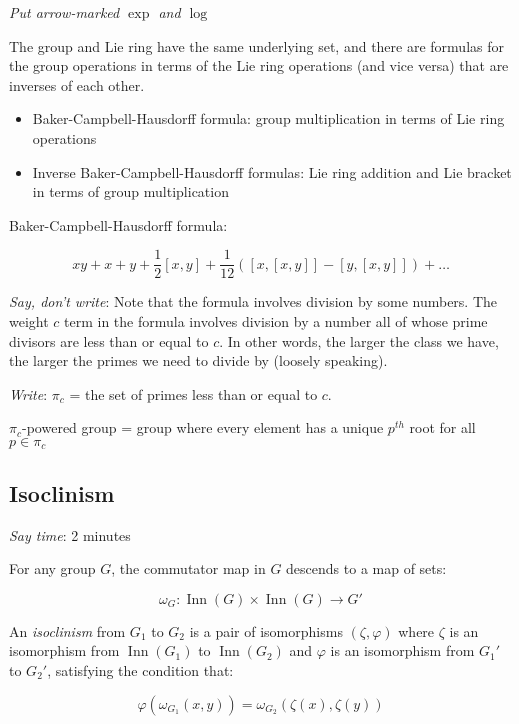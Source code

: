 \documentclass[10pt]{amsart}
\begin{document}
{\em Put arrow-marked $\exp$ and $\log$}

The group and Lie ring have the same underlying set, and there are
formulas for the group operations in terms of the Lie ring operations
(and vice versa) that are inverses of each other.

\begin{itemize}
\item Baker-Campbell-Hausdorff formula: group multiplication in terms
  of Lie ring operations
\item Inverse Baker-Campbell-Hausdorff formulas: Lie ring addition and
  Lie bracket in terms of group multiplication
\end{itemize}

Baker-Campbell-Hausdorff formula:

$$xy + x + y + \frac{1}{2}[x,y] + \frac{1}{12}([x,[x,y]] - [y,[x,y]]) + \dots$$

{\em Say, don't write}: Note that the formula involves division by
some numbers. The weight $c$ term in the formula involves division by
a number all of whose prime divisors are less than or equal to $c$. In
other words, the larger the class we have, the larger the primes we
need to divide by (loosely speaking).

{\em Write}: $\pi_c$ = the set of primes less than or equal to $c$.

$\pi_c$-powered group = group where every element has a unique
$p^{th}$ root for all $p \in \pi_c$

\subsection{Isoclinism}

{\em Say time}: 2 minutes

For any group $G$, the commutator map in $G$ descends to a map of sets:

$$\omega_G: \operatorname{Inn}(G) \times \operatorname{Inn}(G) \to G'$$

An {\em isoclinism} from $G_1$ to $G_2$ is a pair of isomorphisms
$(\zeta,\varphi)$ where $\zeta$ is an isomorphism from
$\operatorname{Inn}(G_1)$ to $\operatorname{Inn}(G_2)$ and $\varphi$ is an
isomorphism from $G_1'$ to $G_2'$, satisfying the condition that:

\begin{equation}\label{eq:homoclinism-pointed}
  \varphi(\omega_{G_1}(x,y)) = \omega_{G_2}(\zeta(x),\zeta(y))
\end{equation}
\end{document}
